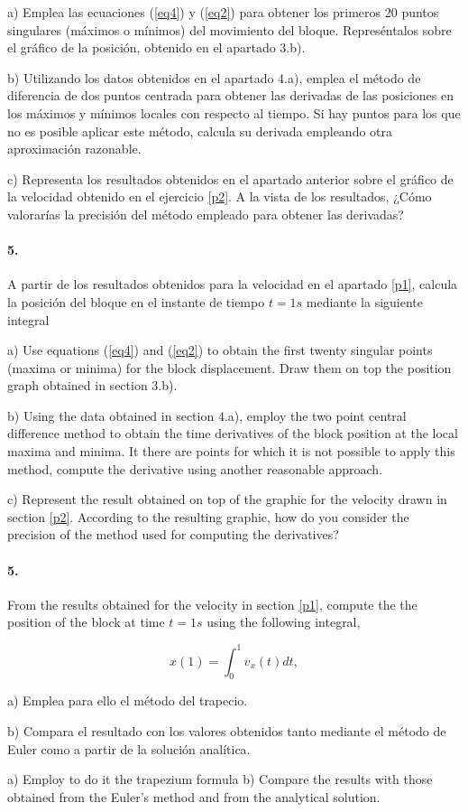 \begin{paracol}{2}	
a) Emplea las ecuaciones (\ref{eq4}) y (\ref{eq2}) para obtener los primeros 20 puntos singulares (máximos o mínimos) del movimiento del bloque. Represéntalos sobre el gráfico de la posición, obtenido en el apartado 3.b).

b) Utilizando los datos obtenidos en el apartado 4.a), emplea el método de diferencia de dos puntos centrada para obtener las derivadas de las posiciones en los máximos y mínimos locales con respecto al tiempo. Si hay puntos para los que no es posible aplicar este método, calcula su derivada empleando otra aproximación razonable.
 
c) Representa los resultados obtenidos en el apartado anterior sobre el gráfico de la velocidad obtenido en el ejercicio \ref{p2}. A la vista de los resultados, ¿Cómo valorarías la precisión del método empleado para obtener las derivadas? 

\paragraph{5.} A partir de los resultados obtenidos para la velocidad en el apartado \ref{p1}, calcula la posición del bloque en el instante de tiempo $t=1s$ mediante la siguiente integral

\switchcolumn
a) Use equations (\ref{eq4}) and (\ref{eq2}) to obtain the first twenty singular points (maxima or minima) for the block displacement. Draw them on top the position graph obtained in section 3.b).  

b) Using the data obtained in section 4.a), employ the two point central difference method to obtain the time derivatives of the block position at the local maxima and minima. It there are points for which it is not possible to apply this method, compute the derivative using another reasonable approach.

c) Represent the result obtained on top of the graphic for the velocity drawn in section \ref{p2}. According to the resulting graphic, how do you consider the precision of the method used for computing the derivatives?

\paragraph{5.} From the results obtained for the velocity in section \ref{p1}, compute the the position of the block at time $t=1s$ using the following integral,  
\end{paracol}
\begin{equation}
x(1) = \int_0^1v_x(t)dt,
\end{equation}
\begin{paracol}{2}
a) Emplea para ello el método del trapecio.

b) Compara el resultado con los valores obtenidos tanto mediante el método de Euler como a partir de la solución analítica.

\switchcolumn
a) Employ to do it the trapezium formula
b) Compare the results with those obtained from the Euler's method and from the analytical solution.


\end{paracol}
